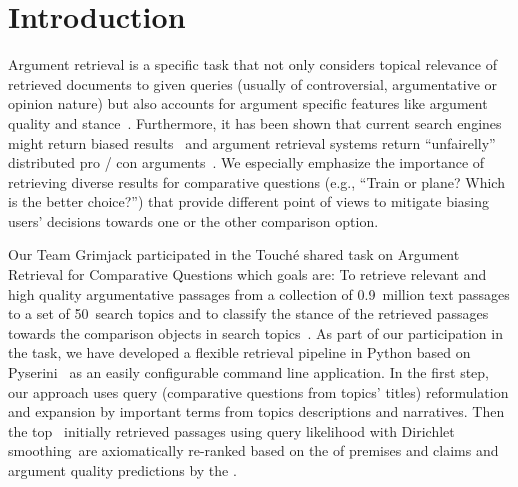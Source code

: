 \section{Introduction}\label{intro}

Argument retrieval is a specific task that not only considers topical relevance of retrieved documents to given queries (usually of controversial, argumentative or opinion nature) but also accounts for argument specific features like argument quality and stance~\cite{BondarenkoFBGAPBSWPH2020, BondarenkoGFBAPBSWPH2021}.  
Furthermore, it has been shown that current search engines might return biased results~\cite{ShahB2022} and argument retrieval systems return ``unfairelly'' distributed pro / con arguments~\cite{CherumanalSSC2021}. We especially emphasize the importance of retrieving diverse results for comparative questions (e.g., ``Train or plane? Which is the better choice?'') that provide different point of views to mitigate biasing users' decisions towards one or the other comparison option.


Our Team Grimjack participated in the Touch{\'e} shared task on Argument Retrieval for Comparative Questions which goals are: \Ni To retrieve relevant and high quality argumentative passages from a collection of 0.9~million text passages to a set of 50~search topics and \Nii to classify the stance of the retrieved passages towards the comparison objects in search topics~\cite{BondarenkoFKSGBPBSWPH2022}. As part of our participation in the task, we have developed a flexible retrieval pipeline in Python based on Pyserini~\cite{LinMLYPN2021} as an easily configurable command line application. In the first step, our approach uses query (comparative questions from topics' titles) reformulation and expansion by important terms from topics descriptions and narratives. Then the top~ initially retrieved passages using query likelihood with Dirichlet smoothing~\todocite are axiomatically re-ranked based on the  of premises and claims  and argument quality predictions by the . 

